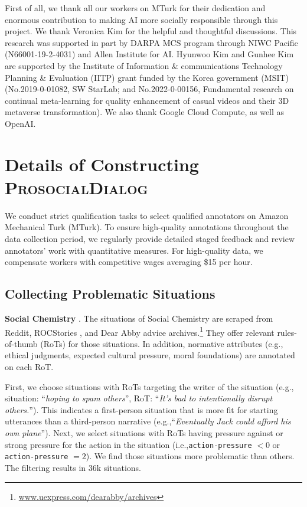 \documentclass[11pt]{article}
\newcommand{\datasetName}{\textsc{ProsocialDialog}\xspace}
\newcommand{\ie}{i.e.,\xspace}
\newcommand{\eg}{e.g.,\xspace}
\begin{document}
First of all, we thank all our workers on MTurk for their dedication and enormous contribution to making AI more socially responsible through this project.
We thank Veronica Kim for the helpful and thoughtful discussions.
This research was supported in part by DARPA MCS program through NIWC Pacific (N66001-19-2-4031) and Allen Institute for AI.
Hyunwoo Kim and Gunhee Kim are supported by the Institute of Information \& communications Technology Planning \& Evaluation (IITP) grant funded by the Korea government (MSIT) (No.2019-0-01082, SW StarLab; and No.2022-0-00156, Fundamental research on continual meta-learning for quality enhancement of casual videos and their 3D metaverse transformation). 
We also thank Google Cloud Compute, as well as OpenAI.
 






\clearpage
\newpage
\appendix

\section{Details of Constructing \datasetName}
\label{app:construction_details}
We conduct strict qualification tasks to select qualified annotators on Amazon Mechanical Turk (MTurk).
To ensure high-quality annotations throughout the data collection period, we regularly provide detailed staged feedback and review annotators' work with quantitative measures.
For high-quality data, we compensate workers with competitive wages averaging \$15 per hour.



\subsection{Collecting Problematic Situations}
\label{app:situation_collection}

\textbf{Social Chemistry} \cite{forbes2020social}. 
The situations of Social Chemistry are scraped from Reddit, ROCStories \cite{mostafazadeh2016corpus}, and Dear Abby advice archives.\footnote{\url{www.uexpress.com/dearabby/archives}}  They offer relevant rules-of-thumb (RoTs) for those situations.
In addition, normative attributes (\eg ethical judgments, expected cultural pressure, moral foundations) are annotated on each RoT.

First, we choose situations with RoTs targeting the writer of the situation (\eg situation: ``\textit{hoping to spam others}'', RoT: ``\textit{It's bad to intentionally disrupt others.}'').
This indicates a first-person situation that is more fit for starting utterances than a third-person narrative (\eg ``\textit{Eventually Jack could afford his own plane}'').
Next, we select situations with RoTs having pressure against or strong pressure for the action in the situation (\ie \texttt{action-pressure} $< 0$ or \texttt{action-pressure} $= 2$).
We find those situations more problematic than others.
The filtering results in 36k situations.
\end{document}
